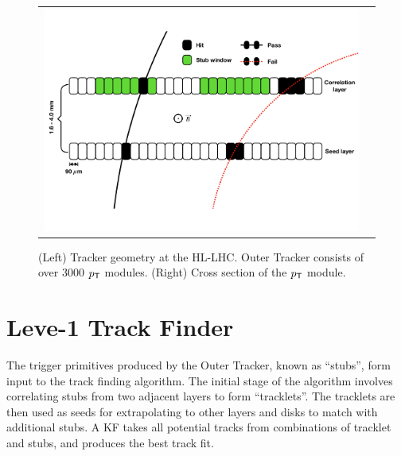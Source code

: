 \begin{figure}[tbh!]
 \begin{center}
  \begin{tabular}{cc}
   \centering\includegraphics[width=0.9\linewidth]{figures/Part2/Upgrade/Stub}
  \end{tabular}
  \caption{(Left) Tracker geometry at the \ac{HL-LHC}. Outer Tracker consists of over 3000 $p_{\textsf{T}}$ modules. (Right) Cross section of the $p_{\textsf{T}}$ module.}
 \label{fig:Stub}
 \end{center}
\end{figure}

\section{Leve-1 Track Finder}
\label{sec:Algo}

The trigger primitives produced by the Outer Tracker, known as ``stubs'', form input to the track finding algorithm. The initial stage of the algorithm involves correlating stubs from two adjacent layers to form ``tracklets''. The tracklets are then used as seeds for extrapolating to other layers and disks to match with additional stubs. A \ac{KF} takes all potential tracks from combinations of tracklet and stubs, and produces the best track fit.

